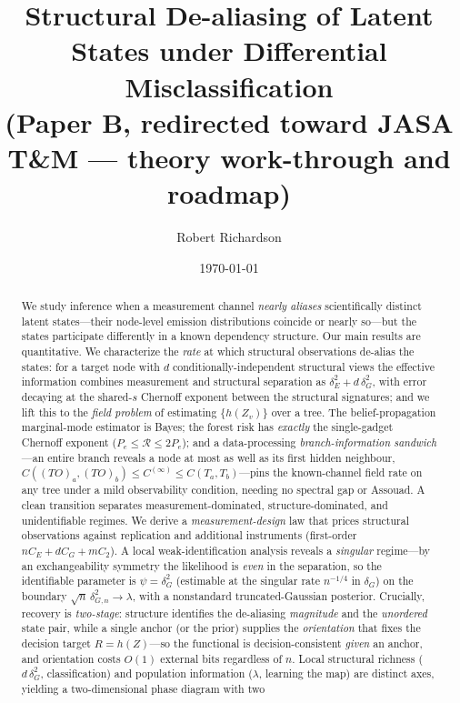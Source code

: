 \documentclass[11pt]{article}
\title{\textbf{Structural De-aliasing of Latent States under Differential Misclassification}\\[3pt]
\large\normalfont(Paper B, redirected toward JASA T\&M --- theory work-through and roadmap)}
\author{Robert Richardson}
\date{\today}
\begin{document}
\maketitle

\begin{abstract}
We study inference when a measurement channel \emph{nearly aliases} scientifically distinct latent states---their
node-level emission distributions coincide or nearly so---but the states participate differently in a known
dependency structure. Our main results are quantitative. We characterize the \emph{rate} at which structural
observations de-alias the states: for a target node with $d$ conditionally-independent structural views the
effective information combines measurement and structural separation as $\delta_E^2+d\,\delta_G^2$, with error
decaying at the shared-$s$ Chernoff exponent between the structural signatures; and we lift this to the \emph{field
problem} of estimating $\{h(Z_v)\}$ over a tree. The belief-propagation marginal-mode estimator is Bayes; the
forest risk has \emph{exactly} the single-gadget Chernoff exponent ($P_e\le\mathcal R\le 2P_e$); and a
data-processing \emph{branch-information sandwich}---an entire branch reveals a node at most as well as its first
hidden neighbour, $C((TO)_a,(TO)_b)\le C^{(\infty)}\le C(T_a,T_b)$---pins the known-channel field rate on any tree
under a mild observability condition, needing no spectral gap or Assouad. A clean transition separates
measurement-dominated, structure-dominated, and unidentifiable regimes. We derive a \emph{measurement-design} law that prices structural
observations against replication and additional instruments (first-order $nC_E+dC_G+mC_2$). A local
weak-identification analysis reveals a \emph{singular} regime---by an exchangeability symmetry the likelihood is
\emph{even} in the separation, so the identifiable parameter is $\psi=\delta_G^2$ (estimable at the singular rate
$n^{-1/4}$ in $\delta_G$) on the boundary $\sqrt n\,\delta_{G,n}^2\to\lambda$, with a nonstandard truncated-Gaussian
posterior. Crucially, recovery is \emph{two-stage}: structure identifies the de-aliasing \emph{magnitude} and the
\emph{unordered} state pair, while a single anchor (or the prior) supplies the \emph{orientation} that fixes the
decision target $R=h(Z)$---so the functional is decision-consistent \emph{given} an anchor, and orientation costs
$O(1)$ external bits regardless of $n$. Local structural richness ($d\,\delta_G^2$, classification) and population
information ($\lambda$, learning the map) are distinct axes, yielding a two-dimensional phase diagram with two

\end{abstract}
\end{document}
